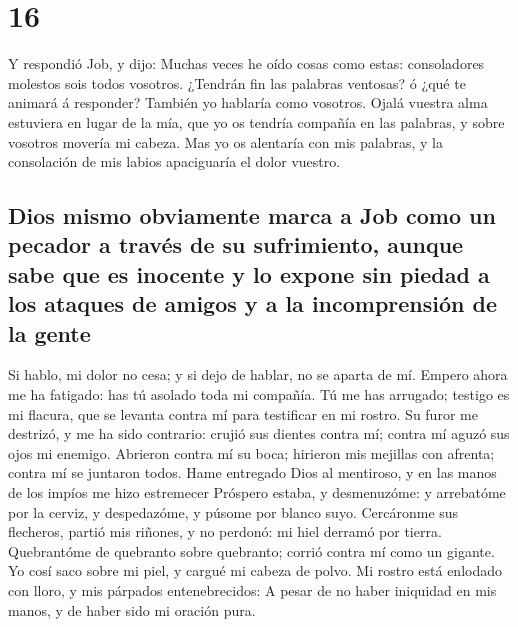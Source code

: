 \hypertarget{section-15}{%
\section{16}\label{section-15}}

 Y respondió Job, y dijo:  Muchas veces he
oído cosas como estas: consoladores molestos sois todos vosotros.
 ¿Tendrán fin las palabras ventosas? ó ¿qué te animará á
responder?  También yo hablaría como vosotros. Ojalá
vuestra alma estuviera en lugar de la mía, que yo os tendría compañía en
las palabras, y sobre vosotros movería mi cabeza.  Mas yo
os alentaría con mis palabras, y la consolación de mis labios
apaciguaría el dolor vuestro.

\hypertarget{dios-mismo-obviamente-marca-a-job-como-un-pecador-a-travuxe9s-de-su-sufrimiento-aunque-sabe-que-es-inocente-y-lo-expone-sin-piedad-a-los-ataques-de-amigos-y-a-la-incomprensiuxf3n-de-la-gente}{%
\subsection{Dios mismo obviamente marca a Job como un pecador a través
de su sufrimiento, aunque sabe que es inocente y lo expone sin piedad a
los ataques de amigos y a la incomprensión de la
gente}\label{dios-mismo-obviamente-marca-a-job-como-un-pecador-a-travuxe9s-de-su-sufrimiento-aunque-sabe-que-es-inocente-y-lo-expone-sin-piedad-a-los-ataques-de-amigos-y-a-la-incomprensiuxf3n-de-la-gente}}

 Si hablo, mi dolor no cesa; y si dejo de hablar, no se
aparta de mí.  Empero ahora me ha fatigado: has tú asolado
toda mi compañía.  Tú me has arrugado; testigo es mi
flacura, que se levanta contra mí para testificar en mi rostro.
 Su furor me destrizó, y me ha sido contrario: crujió sus
dientes contra mí; contra mí aguzó sus ojos mi enemigo. 
Abrieron contra mí su boca; hirieron mis mejillas con afrenta; contra mí
se juntaron todos.  Hame entregado Dios al mentiroso, y
en las manos de los impíos me hizo estremecer  Próspero
estaba, y desmenuzóme: y arrebatóme por la cerviz, y despedazóme, y
púsome por blanco suyo.  Cercáronme sus flecheros, partió
mis riñones, y no perdonó: mi hiel derramó por tierra. 
Quebrantóme de quebranto sobre quebranto; corrió contra mí como un
gigante.  Yo cosí saco sobre mi piel, y cargué mi cabeza
de polvo.  Mi rostro está enlodado con lloro, y mis
párpados entenebrecidos:  A pesar de no haber iniquidad
en mis manos, y de haber sido mi oración pura.


